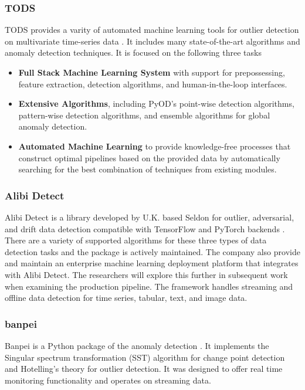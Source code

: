 \subsubsection{TODS}
TODS provides a varity of automated machine learning tools for outlier detection on multivariate time-series data \cite{Lai_2021_TODS}. It includes many state-of-the-art algorithms and anomaly detection techniques. It is focused on the following three tasks \cite{Lai_2021_TODS}
\begin{itemize}[leftmargin=1cm]
    \item \textbf{Full Stack Machine Learning System} with support for prepossessing, feature extraction, detection algorithms, and human-in-the-loop interfaces.
    \item \textbf{Extensive Algorithms}, including PyOD's point-wise detection algorithms, pattern-wise detection algorithms, and ensemble algorithms for global anomaly detection.
    \item \textbf{Automated Machine Learning} to provide knowledge-free processes that construct optimal pipelines based on the provided data by automatically searching for the best combination of techniques from existing modules.
\end{itemize}

\subsubsection{Alibi Detect}
Alibi Detect is a library developed by U.K. based Seldon for outlier, adversarial, and drift data detection compatible with TensorFlow and PyTorch backends \cite{alibi-detect}. There are a variety of supported algorithms for these three types of data detection tasks and the package is actively maintained. The company also provide and maintain an enterprise machine learning deployment platform that integrates with Alibi Detect. The researchers will explore this further in subsequent work when examining the production pipeline. The framework handles streaming and offline data detection for time series, tabular, text, and image data. 

\subsubsection{banpei}

Banpei is a Python package of the anomaly detection \cite{banpei}. It implements the Singular spectrum transformation (SST) algorithm for change point detection and Hotelling's theory for outlier detection. It was designed to offer real time monitoring functionality and operates on streaming data.

